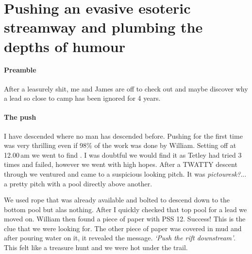 

\section{Pushing an evasive esoteric streamway and plumbing the depths of humour}


\paragraph{Preamble}
After a leasurely shit, me and James are off to check out  and maybe discover why a lead so close to camp has been ignored for 4 years.
\paragraph{The push} I have descended where no man has descended before. Pushing for the first time was very thrilling even if 98$\%$ of the work was done by William. 
Setting off at 12.00\,am we went to find . I was doubtful we would find it as Tetley had tried 3 times and failed, however we went with high hopes.
After a TWATTY descent through  we ventured  and came to a suspicious looking pitch. It was \textit{pictouresk?}...  a pretty pitch with a pool directly above another.

We used rope that was already available and bolted to descend down to the bottom pool but alas nothing. After I quickly checked that top pool for a lead we moved on. William then found a piece of paper with PSS 12. Success! This is the clue that we were looking for. The other piece of paper was covered in mud and after pouring water on it, it revealed the message.  \textit{`Push the rift downstream'}. This felt like a treasure hunt and we were hot under the trail.

